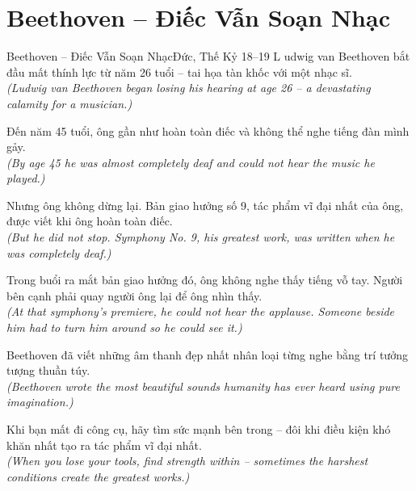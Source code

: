 \section{Beethoven -- Điếc Vẫn Soạn Nhạc}
\begin{truyen}{Beethoven -- Điếc Vẫn Soạn Nhạc}{Đức, Thế Kỷ 18--19}
L udwig van Beethoven bắt đầu mất thính lực từ năm 26 tuổi -- tai họa tàn khốc với một nhạc sĩ.\\
\textit{(Ludwig van Beethoven began losing his hearing at age 26 -- a devastating calamity for a musician.)}

Đến năm 45 tuổi, ông gần như hoàn toàn điếc và không thể nghe tiếng đàn mình gảy.\\
\textit{(By age 45 he was almost completely deaf and could not hear the music he played.)}

Nhưng ông không dừng lại. Bản giao hưởng số 9, tác phẩm vĩ đại nhất của ông, được viết khi ông hoàn toàn điếc.\\
\textit{(But he did not stop. Symphony No. 9, his greatest work, was written when he was completely deaf.)}

Trong buổi ra mắt bản giao hưởng đó, ông không nghe thấy tiếng vỗ tay. Người bên cạnh phải quay người ông lại để ông nhìn thấy.\\
\textit{(At that symphony's premiere, he could not hear the applause. Someone beside him had to turn him around so he could see it.)}

Beethoven đã viết những âm thanh đẹp nhất nhân loại từng nghe bằng trí tưởng tượng thuần túy.\\
\textit{(Beethoven wrote the most beautiful sounds humanity has ever heard using pure imagination.)}

\end{truyen}
\begin{baihoc}
  Khi bạn mất đi công cụ, hãy tìm sức mạnh bên trong -- đôi khi điều kiện khó khăn nhất tạo ra tác phẩm vĩ đại nhất.\\
  \textit{(When you lose your tools, find strength within -- sometimes the harshest conditions create the greatest works.)}
\end{baihoc}

